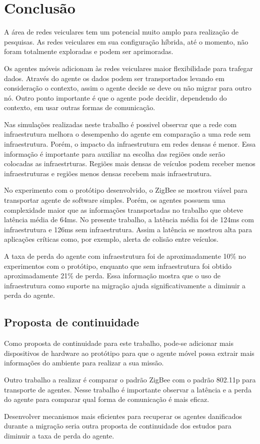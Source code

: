 \section{Conclusão}
\label{sec:conclusao}

A área de redes veiculares tem um potencial muito amplo para realização de pesquisas.  As redes veiculares em sua configuração híbrida, até o momento, não foram totalmente exploradas e podem ser aprimoradas.

Os agentes móveis adicionam às redes veiculares maior flexibilidade para trafegar dados. Através do agente os dados podem ser transportados levando em consideração o contexto, assim o agente decide se deve ou não migrar para outro nó. Outro ponto importante é que o agente pode decidir, dependendo do contexto, em usar outras formas de comunicação. 

Nas simulações realizadas neste trabalho é possivel observar que a rede com infraestrutura melhora o desempenho do agente em comparação a uma rede sem infraestrutura. Porém, o impacto da infraestrutura em redes densas é menor. Essa informação é importante para auxiliar na escolha das regiões onde serão colocadas as infraestrturas. Regiões mais densas de veículos podem receber menos infraestruturas e regiões menos densas recebem mais infraestrutura. 

No experimento com o protótipo desenvolvido, o ZigBee se mostrou viável para transportar agente de software simples. Porém, os agentes possuem uma complexidade maior que as informações transportadas no trabalho \cite{santanaMestrado:2014} que obteve latência média de 64ms. No presente trabalho, a latência média foi de 124ms com infraestrutura e 126ms sem infraestrutura. Assim a latência se mostrou alta para aplicações críticas como, por exemplo, alerta de colisão entre veículos.

A taxa de perda do agente com infraestrutura foi de aproximadamente 10\% no experimentos com o protótipo, enquanto que sem infraestrutura foi obtido aproximadamente 21\% de perda. Essa informação mostra que o uso de infraestrutura como suporte na migração ajuda significativamente a diminuir a perda do agente.


\subsection{Proposta de continuidade}
Como proposta de continuidade para este trabalho, pode-se adicionar mais dispositivos de hardware ao protótipo para que o agente móvel possa extrair mais informações do ambiente para realizar a sua missão.

Outro trabalho a realizar é comparar o padrão ZigBee com o padrão 802.11p para transporte de agentes. Nesse trabalho é importante observar a latência e a perda do agente para comparar qual forma de comunicação é mais eficaz.

Desenvolver mecanismos mais eficientes para recuperar os agentes danificados durante a migração seria outra proposta de continuidade dos estudos para diminuir a taxa de perda do agente. 
